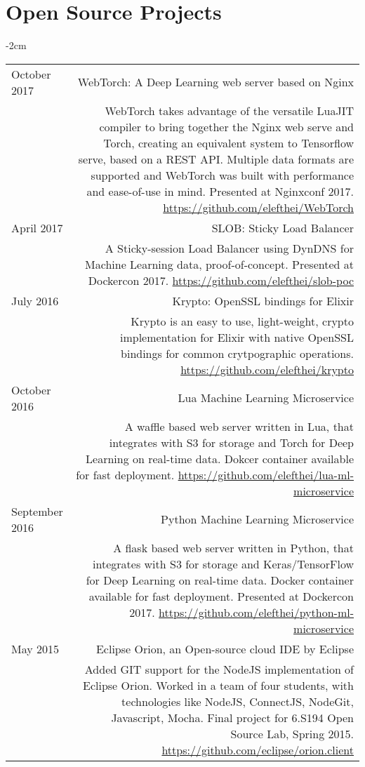 \documentclass[lettersize,10pt]{article}
\begin{document}
\section{Open Source Projects}
\begin{adjustwidth}{}{-2cm}
  \begin{tabularx}{\textwidth}{L R}
    October 2017 & {\sc WebTorch: A Deep Learning web server based on Nginx} \\
    & WebTorch takes advantage of the versatile LuaJIT compiler to bring together the Nginx web serve and Torch, creating an equivalent
    system to Tensorflow serve, based on a REST API. Multiple data formats are supported and WebTorch was built with
    performance and ease-of-use in mind. Presented at Nginxconf 2017. \url{https://github.com/elefthei/WebTorch} \\

    April 2017 & {\sc SLOB: Sticky Load Balancer} \\
    & A Sticky-session Load Balancer using DynDNS for Machine Learning data, proof-of-concept. Presented at Dockercon 2017.
    \url{https://github.com/elefthei/slob-poc} \\

    July 2016 & {\sc Krypto: OpenSSL bindings for Elixir} \\
    & Krypto is an easy to use, light-weight, crypto implementation for Elixir with native OpenSSL bindings for common
    crytpographic operations. \url{https://github.com/elefthei/krypto} \\

    October 2016 & {\sc Lua Machine Learning Microservice} \\
    & A waffle based web server written in Lua, that integrates with S3 for storage and Torch for Deep Learning on real-time data.
    Dokcer container available for fast deployment. \url{https://github.com/elefthei/lua-ml-microservice} \\

    September 2016 & {\sc Python Machine Learning Microservice} \\
    & A flask based web server written in Python, that integrates with S3 for storage and Keras/TensorFlow for Deep Learning on real-time data.
    Docker container available for fast deployment. Presented at Dockercon 2017. \url{https://github.com/elefthei/python-ml-microservice} \\

    May 2015 & {\sc Eclipse Orion, an Open-source cloud IDE by Eclipse} \\
    & Added GIT support for the NodeJS implementation of Eclipse Orion. Worked in a team of four students, with technologies like NodeJS,
    ConnectJS, NodeGit, Javascript, Mocha. Final project for 6.S194 Open Source Lab, Spring 2015.
    \url{https://github.com/eclipse/orion.client} \\


\end{tabularx}
\end{adjustwidth}
\end{document}
